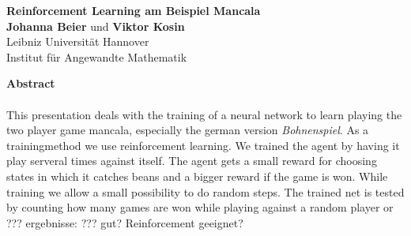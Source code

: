 \documentclass[a4paper,12pt,titlepage]{article}
\begin{document}
\begin{centering}%
\textbf{\Large Reinforcement Learning am Beispiel Mancala}\\[0.5cm]
\textbf{Johanna Beier} und \textbf{Viktor Kosin}\\
Leibniz Universität Hannover\\
Institut für Angewandte Mathematik\\[1cm]
\end{centering}
\textbf{Abstract} \\ \ \\
This presentation deals with the training of a neural network to learn playing the two player game mancala, especially the german version \textit{Bohnenspiel}. As a trainingmethod we use reinforcement learning. We trained the agent by having it play serveral times against itself. The agent gets a small reward for choosing states in which it catches beans and a bigger reward if the game is won. While training we allow a small possibility to do random steps. The trained net is tested by counting how many games are won while playing against a random player or ???
ergebnisse: ??? gut? Reinforcement geeignet?
\end{document}
